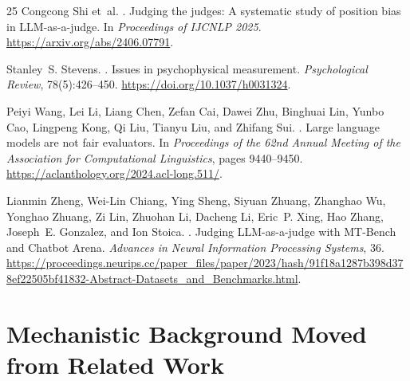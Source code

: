 \documentclass[11pt]{article}
\begin{document}
\begin{thebibliography}{25}
Congcong Shi et~al.
.
\newblock Judging the judges: A systematic study of position bias in
{LLM}-as-a-judge.
\newblock In \emph{Proceedings of IJCNLP 2025}.
\newblock \url{https://arxiv.org/abs/2406.07791}.

Stanley~S. Stevens.
.
\newblock Issues in psychophysical measurement.
\newblock \emph{Psychological Review}, 78(5):426--450.
\newblock \url{https://doi.org/10.1037/h0031324}.

Peiyi Wang, Lei Li, Liang Chen, Zefan Cai, Dawei Zhu, Binghuai Lin,
Yunbo Cao, Lingpeng Kong, Qi Liu, Tianyu Liu, and Zhifang Sui.
.
\newblock Large language models are not fair evaluators.
\newblock In \emph{Proceedings of the 62nd Annual Meeting of the
Association for Computational Linguistics}, pages 9440--9450.
\newblock \url{https://aclanthology.org/2024.acl-long.511/}.

Lianmin Zheng, Wei-Lin Chiang, Ying Sheng, Siyuan Zhuang, Zhanghao Wu,
Yonghao Zhuang, Zi Lin, Zhuohan Li, Dacheng Li, Eric~P. Xing, Hao
Zhang, Joseph~E. Gonzalez, and Ion Stoica.
.
\newblock Judging {LLM}-as-a-judge with {MT-Bench} and {Chatbot Arena}.
\newblock \emph{Advances in Neural Information Processing Systems}, 36.
\newblock \url{https://proceedings.neurips.cc/paper_files/paper/2023/hash/91f18a1287b398d378ef22505bf41832-Abstract-Datasets_and_Benchmarks.html}.
\end{thebibliography}

\appendix

\section{Mechanistic Background Moved from Related Work}
\label{app:rlhf_mechanism}
\end{document}
